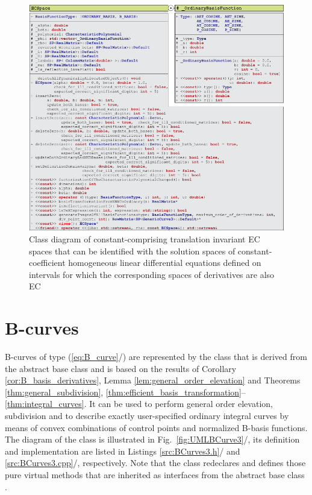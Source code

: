 \documentclass[b5paper, twosided]{book}
\newcommand{\CBlue}[1]{{\color[rgb]{0.0, 0.0, 0.9}{#1}}}
\DeclareRobustCommand{\mref}[1]{\ref{#1}{\relsize{-1}/\pageref{#1}}}
\begin{document}
\begin{figure}[!h]
	
	\centering
	\includegraphics[]{images/UMLECSpace.pdf}
	\caption{Class diagram of constant-comprising translation invariant EC spaces that can be identified with the solution spaces of constant-coefficient homogeneous linear differential equations defined on intervals for which the corresponding spaces of derivatives are also EC}
	\label{fig:UMLECSpace}
\end{figure}



\section{B-curves}

B-curves of type (\mref{eq:B_curve}) are represented by the class \CBlue{BCurve3} that is derived from the abstract base class \CBlue{LinearCombination3} and is based on the results of Corollary \ref{cor:B_basis_derivatives}, Lemma \ref{lem:general_order_elevation} and Theorems \ref{thm:general_subdivision},  \ref{thm:efficient_basis_transformation}--\ref{thm:integral_curves}. It can be used to perform general order elevation, subdivision and to describe exactly user-specified ordinary integral curves by means of convex combinations of control points and normalized B-basis functions. The diagram of the class is illustrated in Fig.\ \mref{fig:UMLBCurve3}, its definition and implementation are listed in Listings \mref{src:BCurves3.h} and \mref{src:BCurves3.cpp}, respectively. Note that the class redeclares and defines those pure virtual methods that are inherited as interfaces from the abstract base class \CBlue{LinearCombination3}.
\end{document}
